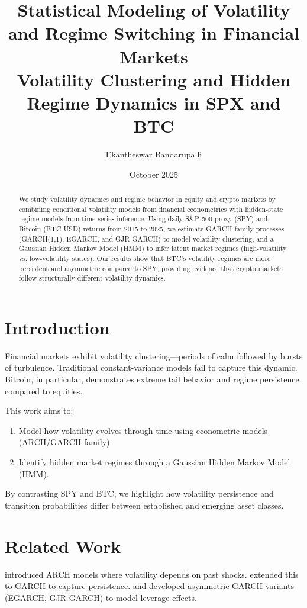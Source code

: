 \documentclass[12pt]{article}
\title{\textbf{Statistical Modeling of Volatility and Regime Switching in Financial Markets}\\
\large Volatility Clustering and Hidden Regime Dynamics in SPX and BTC}
\author{Ekantheswar Bandarupalli}
\date{October 2025}
\begin{document}
\maketitle

\begin{abstract}
We study volatility dynamics and regime behavior in equity and crypto markets by combining conditional volatility models from financial econometrics with hidden-state regime models from time-series inference. Using daily S\&P 500 proxy (SPY) and Bitcoin (BTC-USD) returns from 2015 to 2025, we estimate GARCH-family processes (GARCH(1,1), EGARCH, and GJR-GARCH) to model volatility clustering, and a Gaussian Hidden Markov Model (HMM) to infer latent market regimes (high-volatility vs. low-volatility states). Our results show that BTC’s volatility regimes are more persistent and asymmetric compared to SPY, providing evidence that crypto markets follow structurally different volatility dynamics.
\end{abstract}

\section{Introduction}
Financial markets exhibit volatility clustering—periods of calm followed by bursts of turbulence. Traditional constant-variance models fail to capture this dynamic. Bitcoin, in particular, demonstrates extreme tail behavior and regime persistence compared to equities.

This work aims to:
\begin{enumerate}
    \item Model how volatility evolves through time using econometric models (ARCH/GARCH family).
    \item Identify hidden market regimes through a Gaussian Hidden Markov Model (HMM).
\end{enumerate}

By contrasting SPY and BTC, we highlight how volatility persistence and transition probabilities differ between established and emerging asset classes.

\section{Related Work}
\citet{engle1982arch} introduced ARCH models where volatility depends on past shocks. \citet{bollerslev1986garch} extended this to GARCH to capture persistence. \citet{nelson1991egarch} and \citet{gjr1993} developed asymmetric GARCH variants (EGARCH, GJR-GARCH) to model leverage effects. 
\end{document}
